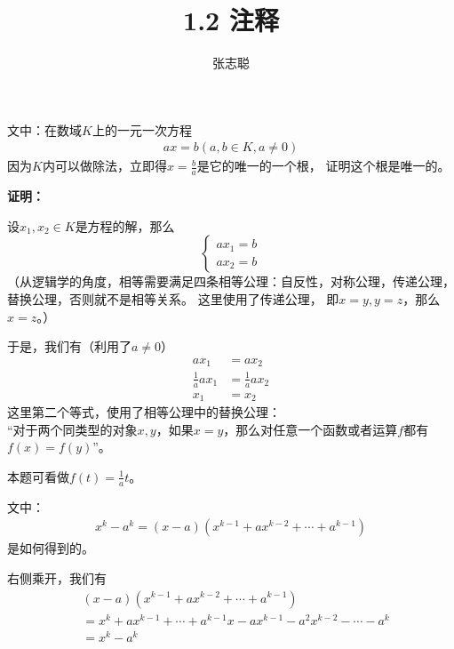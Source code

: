 \documentclass{article}
\begin{document}
\title{1.2 注释}
\author{张志聪}
\maketitle

\begin{zremark}
      文中：在数域$K$上的一元一次方程
      \begin{align*}
            a x = b (a,b \in K, a \neq 0)
      \end{align*}
      因为$K$内可以做除法，立即得$x = \frac{b}{a}$是它的唯一的一个根，
      证明这个根是唯一的。
\end{zremark}

\textbf{证明：}

设$x_1, x_2 \in K$是方程的解，那么
\begin{equation*}
      \begin{cases*}
            ax_1 = b \\
            ax_2 = b
      \end{cases*}
\end{equation*}
（从逻辑学的角度，相等需要满足四条相等公理：自反性，对称公理，传递公理，替换公理，否则就不是相等关系。
这里使用了传递公理，
即$x = y, y = z$，那么$x = z$。）

于是，我们有（利用了$a \neq 0$）
\begin{align*}
      ax_1              & = ax_2              \\
      \frac{1}{a} a x_1 & = \frac{1}{a} a x_2 \\
      x_1               & = x_2
\end{align*}
这里第二个等式，使用了相等公理中的替换公理：\\
“对于两个同类型的对象$x, y$，如果$x = y$，那么对任意一个函数或者运算$f$都有$f(x) = f(y)$”。

本题可看做$f(t) = \frac{1}{a} t$。

\begin{zremark}
      文中：
      \begin{align*}
            x^k - a^k = (x - a)(x^{k - 1} + a x^{k - 2} + \cdots + a^{k - 1})
      \end{align*}
      是如何得到的。
\end{zremark}

右侧乘开，我们有
\begin{align*}
       & (x - a)(x^{k - 1} + a x^{k - 2} + \cdots + a^{k - 1}) \\
       & = x^k + ax^{k - 1} + \cdots + a^{k - 1} x
      - ax^{k - 1} - a^2 x^{k - 2} - \cdots - a^k              \\
       & = x^k - a^k
\end{align*}
\end{document}
